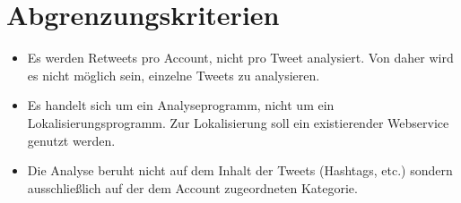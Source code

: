 \section{Abgrenzungskriterien}
\begin{itemize}
	\item Es werden Retweets pro Account, nicht pro Tweet analysiert. Von daher wird es nicht möglich sein, einzelne Tweets zu analysieren.
	\item Es handelt sich um ein Analyseprogramm, nicht um ein Lokalisierungsprogramm. Zur Lokalisierung soll ein existierender Webservice genutzt werden.
	\item Die Analyse beruht nicht auf dem Inhalt der Tweets (Hashtags, etc.) sondern ausschließlich auf der dem Account zugeordneten Kategorie.
\end{itemize}
